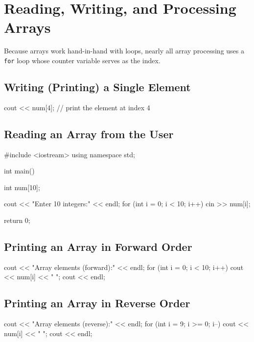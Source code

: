 \section{Reading, Writing, and Processing Arrays}
\label{sec:rwp-arrays}

Because arrays work hand-in-hand with loops, nearly all array processing uses
a \texttt{for} loop whose counter variable serves as the index.

\subsection{Writing (Printing) a Single Element}

\begin{cppcode}
cout << num[4];   // print the element at index 4
\end{cppcode}

\subsection{Reading an Array from the User}

\begin{cppcode}
#include <iostream>
using namespace std;

int main() {
    int num[10];

    cout << "Enter 10 integers:" << endl;
    for (int i = 0; i < 10; i++) {
        cin >> num[i];
    }

    return 0;
}
\end{cppcode}

\subsection{Printing an Array in Forward Order}

\begin{cppcode}
cout << "Array elements (forward):" << endl;
for (int i = 0; i < 10; i++) {
    cout << num[i] << " ";
}
cout << endl;
\end{cppcode}

\subsection{Printing an Array in Reverse Order}

\begin{cppcode}
cout << "Array elements (reverse):" << endl;
for (int i = 9; i >= 0; i--) {
    cout << num[i] << " ";
}
cout << endl;
\end{cppcode}

